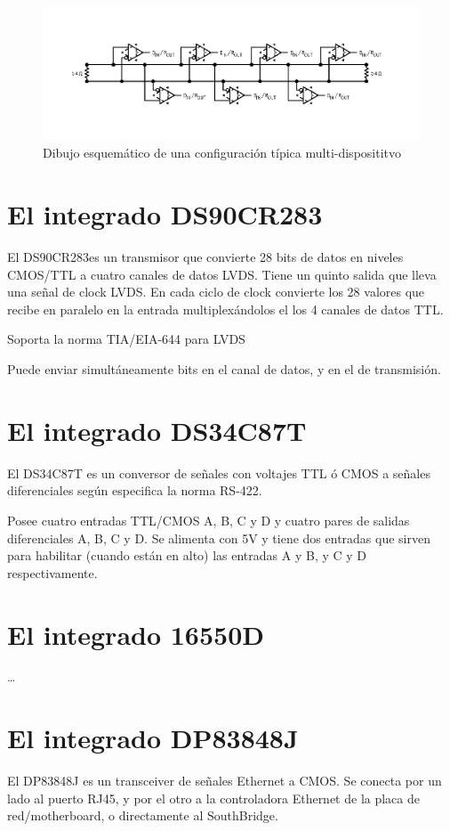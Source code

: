\documentclass[a4paper]{article}
\begin{document}
%
\begin{figure}[H]
\includegraphics[width=15cm]{img/ej1b}
\caption{Dibujo esquemático de una configuración típica multi-disposititvo}
\end{figure}
%
\renewcommand{\ic}{DS90CR283} %
\section{El integrado \ic}
%
El \ic es un transmisor que convierte 28 bits de datos en niveles CMOS/TTL a cuatro canales de datos
LVDS. Tiene un quinto salida que lleva una señal de clock LVDS. En cada ciclo de clock convierte los 28
valores que recibe en paralelo en la entrada multiplexándolos el los 4 canales de datos TTL.

Soporta la norma TIA/EIA-644 para LVDS 

Puede enviar simultáneamente  bits en el canal de datos, y  en el de transmisión.
%
\section{El integrado DS34C87T}
%
El DS34C87T es un conversor  de señales con voltajes TTL ó CMOS a
señales diferenciales según especifica la norma RS-422.

Posee cuatro entradas TTL/CMOS A, B, C y D y cuatro pares de salidas diferenciales A, B, C y D.
Se alimenta con 5V y tiene dos entradas que sirven para habilitar (cuando están en alto) las entradas
A y B, y C y D respectivamente. 
%
\section{El integrado 16550D}
%
\ldots
%
\section{El integrado DP83848J}
%
El DP83848J es un transceiver de señales Ethernet a CMOS. Se conecta por un lado al puerto RJ45, y por
el otro a la controladora Ethernet de la placa de red/motherboard, o directamente al SouthBridge.
\end{document}
